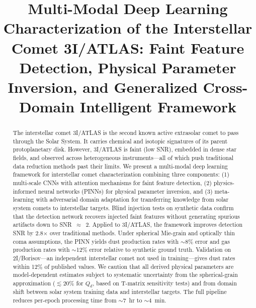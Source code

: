 \documentclass[preprint2]{aastex631}
\begin{document}
\title{Multi-Modal Deep Learning Characterization of the Interstellar Comet 3I/ATLAS: Faint Feature Detection, Physical Parameter Inversion, and Generalized Cross-Domain Intelligent Framework}

%
%

\accepted{}
\published{}

\begin{abstract}
The interstellar comet 3I/ATLAS is the second known active extrasolar comet to pass through the Solar System. It carries chemical and isotopic signatures of its parent protoplanetary disk. However, 3I/ATLAS is faint (low SNR), embedded in dense star fields, and observed across heterogeneous instruments---all of which push traditional data reduction methods past their limits. We present a multi-modal deep learning framework for interstellar comet characterization combining three components: (1) multi-scale CNNs with attention mechanisms for faint feature detection, (2) physics-informed neural networks (PINNs) for physical parameter inversion, and (3) meta-learning with adversarial domain adaptation for transferring knowledge from solar system comets to interstellar targets. Blind injection tests on synthetic data confirm that the detection network recovers injected faint features without generating spurious artifacts down to SNR~$\approx$~2. Applied to 3I/ATLAS, the framework improves detection SNR by 2.8$\times$ over traditional methods. Under spherical Mie-grain and optically thin coma assumptions, the PINN yields dust production rates with $\sim$8\% error and gas production rates with $\sim$12\% error relative to synthetic ground truth. Validation on 2I/Borisov---an independent interstellar comet not used in training---gives dust rates within 12\% of published values. We caution that all derived physical parameters are model-dependent estimates subject to systematic uncertainty from the spherical-grain approximation ($\lesssim 20\%$ for $Q_d$, based on T-matrix sensitivity tests) and from domain shift between solar system training data and interstellar targets. The full pipeline reduces per-epoch processing time from $\sim$7~hr to $\sim$4~min.
\end{abstract}
\end{document}
